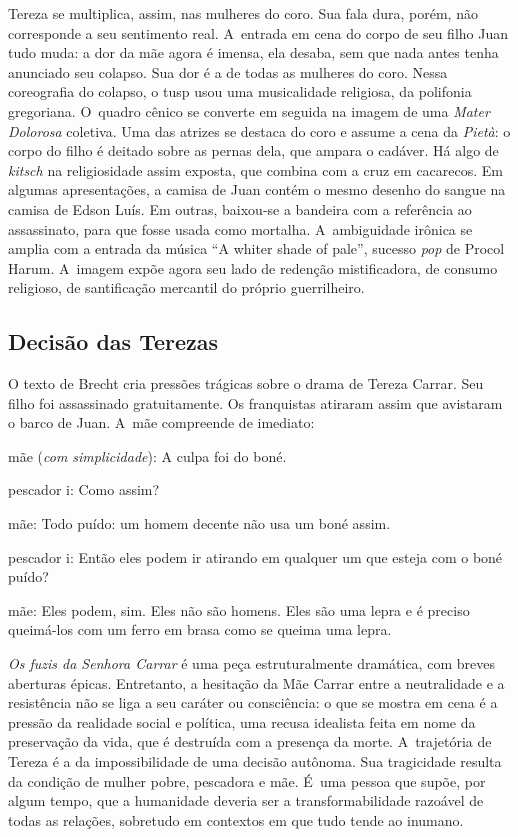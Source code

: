 {Tereza se multiplica, assim, nas mulheres do coro. Sua fala dura, porém,
não corresponde a seu sentimento real. A~entrada em cena do corpo de seu
filho Juan tudo muda: a dor da mãe agora é imensa, ela desaba, sem que
nada antes tenha anunciado seu colapso. Sua dor é a de todas as
mulheres do coro. Nessa coreografia do colapso, o {\sc tusp} usou uma
musicalidade religiosa, da polifonia gregoriana. O~quadro cênico se
converte em seguida na imagem de uma {\it Mater Dolorosa} coletiva. Uma
das atrizes se destaca do coro e assume a cena da {\it Pietà}: o corpo
do filho é deitado sobre as pernas dela, que ampara o cadáver. Há algo
de {\it kitsch} na religiosidade assim exposta, que combina com a cruz
em cacarecos. Em algumas apresentações, a camisa de Juan contém o mesmo
desenho do sangue na camisa de Edson Luís. Em outras, baixou-se a
bandeira com a referência ao assassinato, para que fosse usada como
mortalha. A~ambiguidade irônica se amplia com a entrada da música “A
whiter shade of pale”, sucesso {\it pop} de Procol Harum. A~imagem expõe
agora seu lado de redenção mistificadora, de consumo religioso, de
santificação mercantil do próprio guerrilheiro.


\subsection{Decisão das Terezas}

O texto de Brecht cria pressões trágicas sobre o drama de Tereza Carrar.
Seu filho foi assassinado gratuitamente. Os franquistas atiraram assim
que avistaram o barco de Juan. A~mãe compreende de imediato:

\startblockquote
{\sc mãe} ({\it com simplicidade}): A culpa foi do boné.

{\sc pescador i}: Como assim?

{\sc mãe}: Todo puído: um homem decente não usa um boné assim.

{\sc pescador i}: Então eles podem ir atirando em qualquer um que esteja com
o boné puído?

{\sc mãe}: Eles podem, sim. Eles não são homens. Eles são uma lepra e é
preciso queimá-los com um ferro em brasa como se queima uma lepra.
\stopblockquote

{\it Os fuzis da Senhora Carrar} é uma peça estruturalmente dramática,
com breves aberturas épicas. Entretanto, a hesitação da Mãe Carrar entre
a neutralidade e a resistência não se liga a seu caráter ou consciência:
o que se mostra em cena é a pressão da realidade social e política, uma
recusa idealista feita em nome da preservação da vida, que é destruída
com a presença da morte. A~trajetória de Tereza é a da impossibilidade
de uma decisão autônoma. Sua tragicidade resulta da condição de mulher
pobre, pescadora e mãe. É~uma pessoa que supõe, por algum tempo, que a
humanidade deveria ser a transformabilidade razoável de todas as
relações, sobretudo em contextos em que tudo tende ao inumano.

}
